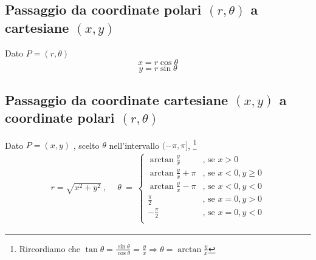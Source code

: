 \documentclass{book}
\begin{document}
\subsection{Passaggio da coordinate polari \texorpdfstring{\((r, \theta)\)}{(r, theta)} a cartesiane \texorpdfstring{\((x, y)\)}{(x, y)}}
\begin{theorem}
    Dato \(P = (r, \theta)\)
    \[x = r \cos{\theta}\]
    \[y = r \sin{\theta}\]
\end{theorem}
\subsection{Passaggio da coordinate cartesiane \texorpdfstring{\((x, y)\)}{(x, y)} a coordinate polari \texorpdfstring{\((r, \theta)\)}{(r, theta)}}
\begin{theorem}
    Dato \(P = (x, y)\) , scelto \(\theta\) nell'intervallo \((-\pi,\pi]\),
    \footnote[1]{Rircordiamo che \(\tan{\theta}=\displaystyle\frac{\sin{\theta}}{\cos{\theta}} = \displaystyle\frac{y}{x} \Rightarrow \theta = \arctan{\displaystyle\frac{y}{x}}\)}
    \begin{align*}
        r = \sqrt{x^2 + y^2}\ ,\  & \ \theta\ =\ \begin{cases}
                                                     \displaystyle \arctan{\frac{y}{x}}       & \text{, se } x > 0            \\[10pt]
                                                     \displaystyle \arctan{\frac{y}{x} + \pi} & \text{, se } x < 0 , y \geq 0 \\[10pt]
                                                     \displaystyle \arctan{\frac{y}{x} - \pi} & \text{, se } x < 0 , y < 0    \\[10pt]
                                                     \displaystyle \frac{\pi}{2}              & \text{, se } x = 0 , y > 0    \\[10pt]
                                                     -\displaystyle \frac{\pi}{2}             & \text{, se } x = 0 , y < 0    \\
                                                 \end{cases}
    \end{align*}
\end{theorem}
\end{document}
